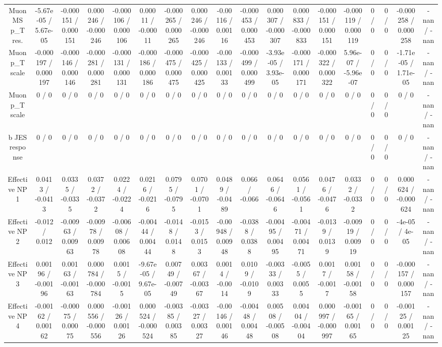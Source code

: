 \documentclass[10pt]{article}
\begin{document}
\begin{table}[htbp]
\begin{center}
\begin{tabular}{|c|c|c|c|c|c|c|c|c|c|c|c|c|c|c|c|c|c|}
  Muon MS p_{T} res. & -5.67e-05 / 5.67e-05 & -0.000151 / 0.000151 & 0.000246 / -0.000246 & -0.000106 / 0.000106 & 0.00011 / -0.00011 & -0.000265 / 0.000265 & 0.000246 / -0.000246 & -0.00116 / 0.00116 & -0.000453 / 0.000453 & 0.000307 / -0.000307 & 0.000833 / -0.000833 & -0.000151 / 0.000151 & -0.000119 / 0.000119 & 0 / 0 & 0 / 0 & -0.000258 / 0.000258 & -nan / -nan \\ 
  Muon p_{T} scale & -0.000197 / 0.000197 & -0.000146 / 0.000146 & -0.000281 / 0.000281 & -0.000131 / 0.000131 & -0.000186 / 0.000186 & -0.000475 / 0.000475 & -0.000425 / 0.000425 & -0.00133 / 0.00133 & -0.000499 / 0.000499 & -3.93e-05 / 3.93e-05 & -0.000171 / 0.000171 & -0.000322 / 0.000322 & 5.96e-07 / -5.96e-07 & 0 / 0 & 0 / 0 & -1.71e-05 / 1.71e-05 & -nan / -nan \\ 
  Muon p_{T} scale & 0 / 0 & 0 / 0 & 0 / 0 & 0 / 0 & 0 / 0 & 0 / 0 & 0 / 0 & 0 / 0 & 0 / 0 & 0 / 0 & 0 / 0 & 0 / 0 & 0 / 0 & 0 / 0 & 0 / 0 & 0 / 0 & -nan / -nan \\ 
  b JES response & 0 / 0 & 0 / 0 & 0 / 0 & 0 / 0 & 0 / 0 & 0 / 0 & 0 / 0 & 0 / 0 & 0 / 0 & 0 / 0 & 0 / 0 & 0 / 0 & 0 / 0 & 0 / 0 & 0 / 0 & 0 / 0 & -nan / -nan \\ 
  Effective NP 1 & 0.0413 / -0.0413 & 0.0335 / -0.0335 & 0.0372 / -0.0372 & 0.0224 / -0.0224 & 0.0216 / -0.0216 & 0.0795 / -0.0795 & 0.0701 / -0.0701 & 0.0489 / -0.0489 & 0.066 / -0.066 & 0.0646 / -0.0646 & 0.0561 / -0.0561 & 0.0476 / -0.0476 & 0.0332 / -0.0332 & 0 / 0 & 0 / 0 & 0.000624 / -0.000624 & -nan / -nan \\ 
  Effective NP 2 & -0.012 / 0.012 & -0.00963 / 0.00963 & -0.00978 / 0.00978 & -0.00608 / 0.00608 & -0.00444 / 0.00444 & -0.0148 / 0.0148 & -0.0153 / 0.0153 & -0.00948 / 0.00948 & -0.0388 / 0.0388 & -0.00495 / 0.00495 & -0.00471 / 0.00471 & -0.0139 / 0.0139 & -0.00919 / 0.00919 & 0 / 0 & 0 / 0 & -4e-05 / 4e-05 & -nan / -nan \\ 
  Effective NP 3 & 0.00196 / -0.00196 & 0.00163 / -0.00163 & 0.000784 / -0.000784 & 0.0015 / -0.0015 & -9.67e-05 / 9.67e-05 & 0.00749 / -0.00749 & 0.00367 / -0.00367 & 0.0014 / -0.0014 & 0.0109 / -0.0109 & -0.00333 / 0.00333 & -0.0055 / 0.0055 & 0.0017 / -0.0017 & 0.00158 / -0.00158 & 0 / 0 & 0 / 0 & -0.000157 / 0.000157 & -nan / -nan \\ 
  Effective NP 4 & -0.00162 / 0.00162 & -0.00075 / 0.00075 & 0.000556 / -0.000556 & -0.00126 / 0.00126 & 0.000524 / -0.000524 & -0.00385 / 0.00385 & -0.00327 / 0.00327 & -0.00146 / 0.00146 & -0.00448 / 0.00448 & 0.00508 / -0.00508 & 0.00404 / -0.00404 & 0.000997 / -0.000997 & -0.00165 / 0.00165 & 0 / 0 & 0 / 0 & -0.00125 / 0.00125 & -nan / -nan \\ 

\end{tabular}
\end{center}
\end{table}
\end{document}
